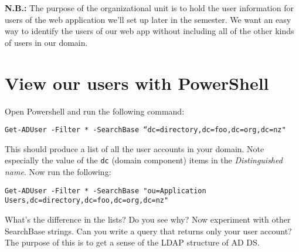 \documentclass{article}
\begin{document}
\textbf{N.B.:} The purpose of the organizational unit is to hold the user information for users of the web application we'll set up later in the semester. We want an easy way to identify the users of our web app without including all of the other kinds of users in our domain.

\section{View our users with PowerShell}
Open Powershell and run the following command: 

\texttt{Get-ADUser -Filter * -SearchBase ``dc=directory,dc=foo,dc=org,dc=nz"}

This should produce a list of all the user accounts in your domain.  Note especially the value of the \texttt{dc} (domain component) items in the \emph{Distinguished name}. Now run the following:

\texttt{Get-ADUser -Filter * -SearchBase "ou=Application Users,dc=directory,dc=foo,dc=org,dc=nz"}

What's the difference in the lists? Do you see why?  Now experiment with other SearchBase strings. Can you write a query that returns only your user account? The purpose of this is to get a sense of the LDAP
structure of AD DS.
\end{document}

